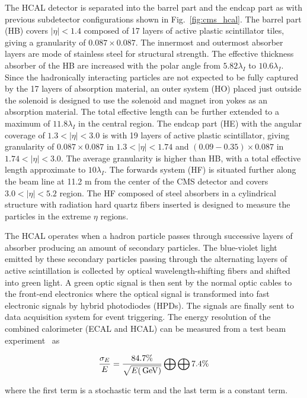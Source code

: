 The HCAL detector is separated into the barrel part and the endcap part as with previous subdetector configurations shown in Fig.~\ref{fig:cms_hcal}.
The barrel part (HB) covers $|\eta|<1.4$ composed of 17 layers of active plastic scintillator tiles, giving a granularity of $0.087 \times 0.087$.
The innermost and outermost absorber layers are mode of stainless steel for structural strength.
The effective thickness absorber of the HB are increased with the polar angle from $5.82 \lambda_I$ to $10.6 \lambda_I$.
Since the hadronically interacting particles are not expected to be fully captured by the 17 layers of absorption material, an outer system (HO) placed just outside the solenoid is designed to use the solenoid and magnet iron yokes as an absorption material.
The total effective length can be further extended to a maximum of $11.8 \lambda_I$ in the central region.
The endcap part (HE) with the angular coverage of $1.3 < |\eta| < 3.0$ is with 19 layers of active plastic scintillator, giving granularity of $0.087 \times 0.087$ in $1.3 < |\eta| < 1.74$ and $(0.09 - 0.35) \times 0.087$ in $1.74 < |\eta| < 3.0$.
The average granularity is higher than HB, with a total effective length approximate to $10 \lambda_I$.
The forwards system (HF) is situated further along the beam line at 11.2 m from the center of the CMS detector and covers $3.0 < |\eta| < 5.2$ region.
The HF composed of steel absorbers in a cylindrical structure with radiation hard quartz fibers inserted is designed to measure the particles in the extreme $\eta$ regions.

The HCAL operates when a hadron particle passes through successive layers of absorber producing an amount of secondary particles.
The blue-violet light emitted by these secondary particles passing through the alternating layers of active scintillation is collected by optical wavelength-shifting fibers and shifted into green light.
A green optic signal is then sent by the normal optic cables to the front-end electronics where the optical signal is transformed into fast electronic signals by hybrid photodiodes (HPDs).
The signals are finally sent to data acquisition system for event triggering.
The energy resolution of the combined calorimeter (ECAL and HCAL) can be measured from a test beam experiment~\cite{USCMS:2009fxn} as
\begin{linenomath}\begin{equation}\label{eq:cms_resol}
    \frac{\sigma_E}{E} = \frac{84.7\%}{\sqrt{E(\,\text{Ge\hspace{-.08em}V})}} \bigoplus \bigoplus 7.4\%
\end{equation}\end{linenomath}
where the first term is a stochastic term and the last term is a constant term.

